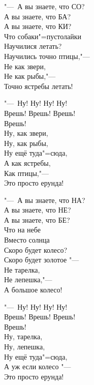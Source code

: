 \begin{flushleft}
"---~А вы знаете, что СО? \\
А вы знаете, что БА? \\
А вы знаете, что КИ? \\
Что собаки"=пустолайки \\
Научилися летать? \\
Научились точно птицы,"--- \\
Не как звери, \\
Не как рыбы,"--- \\
Точно ястребы летать!
\end{flushleft}

\begin{flushright}
\begin{minipage}{0.5\textwidth}
"---~Ну! Ну! Ну! Ну! \\
Врешь! \quad Врешь! \quad Врешь! \\
Врешь! \\
Ну, как звери, \\
Ну, как рыбы, \\
Ну ещё туда"=сюда, \\
А как ястребы, \\
Как птицы,"--- \\
Это просто ерунда!
\end{minipage}
\end{flushright}

\begin{flushleft}
"---~А вы знаете, что НА? \\
А вы знаете, что НЕ? \\
А вы знаете, что БЕ? \\
Что на небе \\
Вместо солнца \\
Скоро будет колесо? \\
Скоро будет золотое "--- \\
Не тарелка, \\
Не лепешка,"--- \\
А большое колесо!
\end{flushleft}

\begin{flushright}
\begin{minipage}{0.5\textwidth}
"---~Ну! Ну! Ну! Ну! \\
Врешь! \quad Врешь! \quad Врешь! \\
Врешь! \\
Ну, тарелка, \\
Ну, лепешка, \\
Ну ещё туда"=сюда, \\
А уж если колесо "--- \\
Это просто ерунда!
\end{minipage}
\end{flushright}

